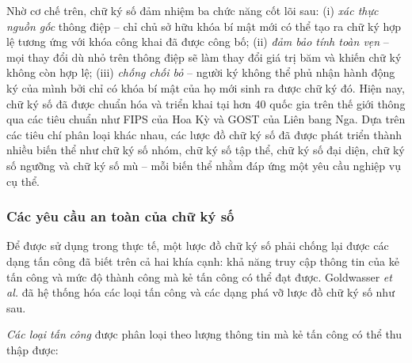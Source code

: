 Nhờ cơ chế trên, chữ ký số đảm nhiệm ba chức năng cốt lõi sau: (i) \textit{xác thực nguồn gốc} thông điệp -- chỉ chủ sở hữu khóa bí mật mới có thể tạo ra chữ ký hợp lệ tương ứng với khóa công khai đã được công bố; (ii) \textit{đảm bảo tính toàn vẹn} -- mọi thay đổi dù nhỏ trên thông điệp sẽ làm thay đổi giá trị băm và khiến chữ ký không còn hợp lệ; (iii) \textit{chống chối bỏ} -- người ký không thể phủ nhận hành động ký của mình bởi chỉ có khóa bí mật của họ mới sinh ra được chữ ký đó. Hiện nay, chữ ký số đã được chuẩn hóa và triển khai tại hơn 40 quốc gia trên thế giới thông qua các tiêu chuẩn như FIPS của Hoa Kỳ và GOST của Liên bang Nga. Dựa trên các tiêu chí phân loại khác nhau, các lược đồ chữ ký số đã được phát triển thành nhiều biến thể như chữ ký số nhóm, chữ ký số tập thể, chữ ký số đại diện, chữ ký số ngưỡng và chữ ký số mù -- mỗi biến thể nhằm đáp ứng một yêu cầu nghiệp vụ cụ thể.

\subsubsection{Các yêu cầu an toàn của chữ ký số}

Để được sử dụng trong thực tế, một lược đồ chữ ký số phải chống lại được các dạng tấn công đã biết trên cả hai khía cạnh: khả năng truy cập thông tin của kẻ tấn công và mức độ thành công mà kẻ tấn công có thể đạt được. Goldwasser \textit{et al.} đã hệ thống hóa các loại tấn công và các dạng phá vỡ lược đồ chữ ký số như sau.

\textit{Các loại tấn công} được phân loại theo lượng thông tin mà kẻ tấn công có thể thu thập được:

